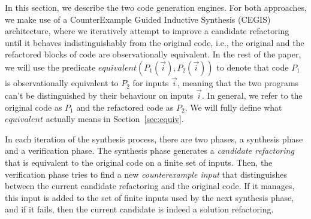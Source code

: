 \documentclass[conference]{IEEEtran}
\begin{document}



In this section, we describe the two code generation engines.
For both approaches, we make use of a CounterExample Guided Inductive Synthesis (CEGIS)~\cite{DBLP:conf/pldi/Solar-LezamaJB08} architecture, where we
iteratively attempt to improve a candidate refactoring
until it behaves indistinguishably
from the original code, i.e., the original and
the refactored blocks of code are observationally equivalent.
%
In the rest of the paper, we will use the predicate
$equivalent(P_1(\vec{i}), P_2(\vec{i}))$ to denote that code $P_1$ is
observationally equivalent to $P_2$ for inputs $\vec{i}$, meaning that the two programs
can't be distinguished by their behaviour on inputs $\vec{i}$.  In general,
we refer to the original code as $P_1$ and the refactored code as
$P_2$. We will fully define what $equivalent$ actually means in Section~\ref{sec:equiv}.

In each iteration of the synthesis process, there are two phases, a synthesis phase and a verification phase. The synthesis phase generates a {\em candidate refactoring} that is equivalent to
the original code on a finite set of inputs. Then, the verification phase tries to find a new {\em counterexample input} that distinguishes between the current candidate refactoring and the original code. If it manages, this input is added to the set of finite inputs used by the next synthesis phase, and if it fails, then the current candidate is indeed a solution refactoring.
\end{document}
